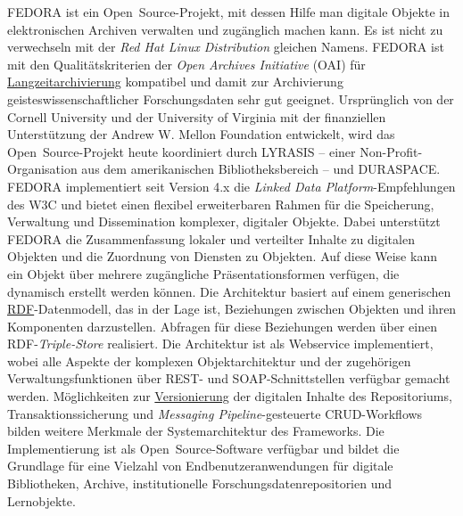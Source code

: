 \documentclass{article}
\begin{document}
    FEDORA ist ein Open Source-Projekt, mit dessen Hilfe man digitale Objekte in elektronischen Archiven verwalten und zugänglich machen kann. Es ist nicht zu verwechseln mit der \emph{Red Hat Linux Distribution} gleichen Namens. FEDORA ist mit den Qualitätskriterien der \emph{Open Archives Initiative} (OAI) für \href{http://gams.uni-graz.at/o:konde.6}{Langzeitarchivierung} kompatibel und damit zur Archivierung geisteswissenschaftlicher Forschungsdaten sehr gut geeignet. Ursprünglich von der Cornell University und der University of Virginia mit der finanziellen Unterstützung der Andrew W. Mellon Foundation entwickelt, wird das Open Source-Projekt heute koordiniert durch LYRASIS – einer Non-Profit-Organisation aus dem amerikanischen Bibliotheksbereich – und DURASPACE.\\
            
        FEDORA implementiert seit Version 4.x die \emph{Linked Data Platform}-Empfehlungen des W3C und bietet einen flexibel erweiterbaren Rahmen für die Speicherung, Verwaltung und Dissemination komplexer, digitaler Objekte. Dabei unterstützt FEDORA die Zusammenfassung lokaler und verteilter Inhalte zu digitalen Objekten und die Zuordnung von Diensten zu Objekten. Auf diese Weise kann ein Objekt über mehrere zugängliche Präsentationsformen verfügen, die dynamisch erstellt werden können. Die Architektur basiert auf einem generischen \href{http://gams.uni-graz.at/o:konde.131}{RDF}-Datenmodell, das in der Lage ist, Beziehungen zwischen Objekten und ihren Komponenten darzustellen. Abfragen für diese Beziehungen werden über einen RDF-\emph{Triple-Store} realisiert. Die Architektur ist als Webservice implementiert, wobei alle Aspekte der komplexen Objektarchitektur und der zugehörigen Verwaltungsfunktionen über REST- und SOAP-Schnittstellen verfügbar gemacht werden. Möglichkeiten zur \href{http://gams.uni-graz.at/o:konde.14}{Versionierung} der digitalen Inhalte des Repositoriums, Transaktionssicherung und \emph{Messaging Pipeline}-gesteuerte CRUD-Workflows bilden weitere Merkmale der Systemarchitektur des Frameworks. Die Implementierung ist als Open Source-Software verfügbar und bildet die Grundlage für eine Vielzahl von Endbenutzeranwendungen für digitale Bibliotheken, Archive, institutionelle Forschungsdatenrepositorien und Lernobjekte.\\
            
\end{document}
